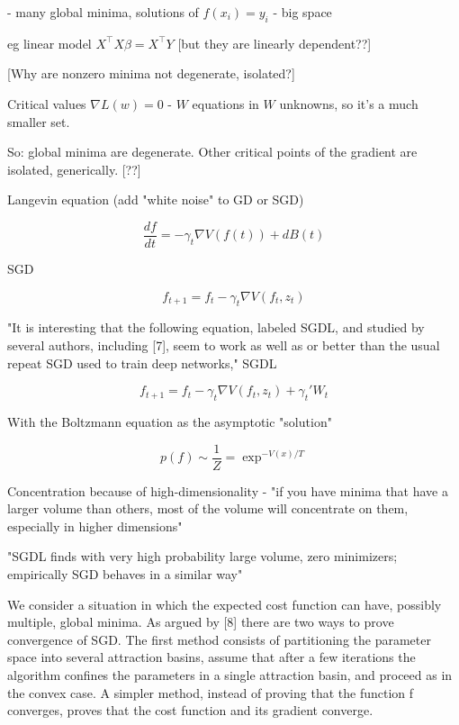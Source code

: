 \documentclass[english]{article}
\begin{document}
- many global minima, solutions of $f(x_i)=y_i$ - big space


eg linear model $X^\top X \beta = X^\top Y$ [but they are linearly dependent??]

[Why are nonzero minima not degenerate, isolated?]


\item Critical values $\nabla L(w)=0$ - $W$ equations in $W$ unknowns, so it's a much smaller set.

So: global minima are degenerate. Other critical points of the gradient are isolated, generically. [??]

\item Langevin equation (add "white noise" to GD or SGD)

$$\frac{df}{dt}
=
-\gamma_t 
\nabla V(f(t))
+dB(t)
$$

SGD 

$$f_{t+1}
=
f_t
-\gamma_t 
\nabla V(f_t,z_t)
$$


"It is interesting that the following equation, labeled SGDL,
and studied by several authors, including [7], seem to work as
well as or better than the usual repeat SGD used to train deep
networks," SGDL 

$$f_{t+1}
=
f_t
-\gamma_t 
\nabla V(f_t,z_t)
+\gamma_t' W_t
$$


With the Boltzmann equation as the asymptotic "solution"

$$
p(f) \sim \frac{1}{Z} = \exp^{-V(x)/T}
$$

\item Concentration because of high-dimensionality - "if you have minima that have a larger volume than others, most of the volume will concentrate on them, especially in higher dimensions"


"SGDL finds with very high probability large volume, zero minimizers; empirically SGD behaves in a similar way"

\item We consider a situation in which the expected cost function can have, possibly multiple, global minima. As argued
by [8] there are two ways to prove convergence of SGD. The
first method consists of partitioning the parameter space into
several attraction basins, assume that after a few iterations the
algorithm confines the parameters in a single attraction basin,
and proceed as in the convex case. A simpler method, instead
of proving that the function f converges, proves that the cost
function and its gradient converge.


\eenum
\end{document}
